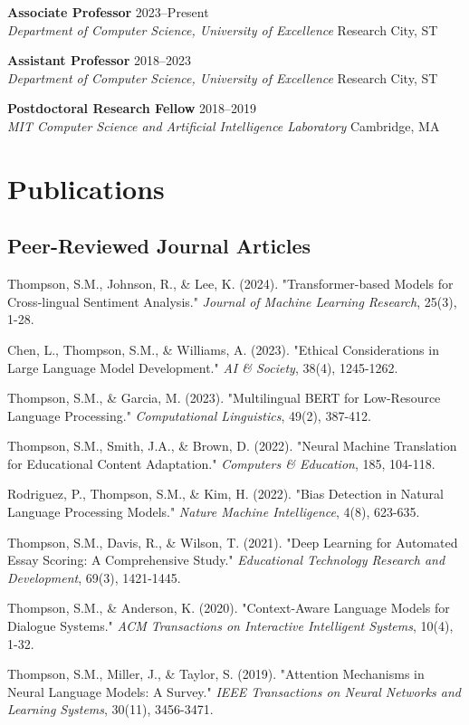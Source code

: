 \documentclass[11pt,letterpaper]{article}
\newcommand{\entry}[4]{\textbf{#1} \hfill #2 \\ \textit{#3} \hfill #4}
\newcommand{\publication}[1]{\item #1}
\begin{document}
\entry{Associate Professor}{2023--Present}
{Department of Computer Science, University of Excellence}{Research City, ST}

\entry{Assistant Professor}{2018--2023}
{Department of Computer Science, University of Excellence}{Research City, ST}

\entry{Postdoctoral Research Fellow}{2018--2019}
{MIT Computer Science and Artificial Intelligence Laboratory}{Cambridge, MA}

\section{Publications}

\subsection{Peer-Reviewed Journal Articles}

\begin{etaremune}[leftmargin=0.5in]
\publication{Thompson, S.M., Johnson, R., \& Lee, K. (2024). "Transformer-based Models for Cross-lingual Sentiment Analysis." \textit{Journal of Machine Learning Research}, 25(3), 1-28.}

\publication{Chen, L., Thompson, S.M., \& Williams, A. (2023). "Ethical Considerations in Large Language Model Development." \textit{AI \& Society}, 38(4), 1245-1262.}

\publication{Thompson, S.M., \& Garcia, M. (2023). "Multilingual BERT for Low-Resource Language Processing." \textit{Computational Linguistics}, 49(2), 387-412.}

\publication{Thompson, S.M., Smith, J.A., \& Brown, D. (2022). "Neural Machine Translation for Educational Content Adaptation." \textit{Computers \& Education}, 185, 104-118.}

\publication{Rodriguez, P., Thompson, S.M., \& Kim, H. (2022). "Bias Detection in Natural Language Processing Models." \textit{Nature Machine Intelligence}, 4(8), 623-635.}

\publication{Thompson, S.M., Davis, R., \& Wilson, T. (2021). "Deep Learning for Automated Essay Scoring: A Comprehensive Study." \textit{Educational Technology Research and Development}, 69(3), 1421-1445.}

\publication{Thompson, S.M., \& Anderson, K. (2020). "Context-Aware Language Models for Dialogue Systems." \textit{ACM Transactions on Interactive Intelligent Systems}, 10(4), 1-32.}

\publication{Thompson, S.M., Miller, J., \& Taylor, S. (2019). "Attention Mechanisms in Neural Language Models: A Survey." \textit{IEEE Transactions on Neural Networks and Learning Systems}, 30(11), 3456-3471.}
\end{etaremune}
\end{document}
